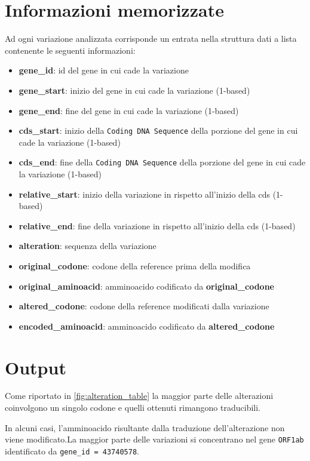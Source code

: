 \documentclass[11pt,italian]{article}
\begin{document}
\section{Informazioni memorizzate}
Ad ogni variazione analizzata corrisponde un entrata nella struttura dati a lista contenente le seguenti informazioni:
\begin{itemize}
    \item \textbf{gene\_id}: id del gene in cui cade la variazione
    \item \textbf{gene\_start}: inizio del gene in cui cade la variazione (1-based)
    \item \textbf{gene\_end}: fine del gene in cui cade la variazione (1-based)
    \item \textbf{cds\_start}: inizio della \lstinline{Coding DNA Sequence} della porzione del gene in cui cade la variazione (1-based)
    \item \textbf{cds\_end}: fine della \lstinline{Coding DNA Sequence} della porzione del gene in cui cade la variazione (1-based)
    \item \textbf{relative\_start}: inizio della variazione in rispetto all'inizio della cds (1-based)
    \item \textbf{relative\_end}: fine della variazione in rispetto all'inizio della cds (1-based)
    \item \textbf{alteration}: sequenza della variazione
    \item \textbf{original\_codone}: codone della reference prima della modifica
    \item \textbf{original\_aminoacid}: amminoacido codificato da \textbf{original\_codone}
    \item \textbf{altered\_codone}: codone della reference modificati dalla variazione
    \item \textbf{encoded\_aminoacid}: amminoacido codificato da \textbf{altered\_codone}
\end{itemize}

\newpage
\section{Output}
Come riportato in \cref{fig:alteration_table} la maggior parte delle alterazioni coinvolgono un singolo codone e quelli ottenuti rimangono traducibili.

In alcuni casi, l'amminoacido risultante dalla traduzione dell'alterazione non viene modificato.\hspace{1mm}La maggior parte delle variazioni si concentrano nel gene \lstinline{ORF1ab} identificato da \lstinline{gene_id = 43740578}.
\end{document}
